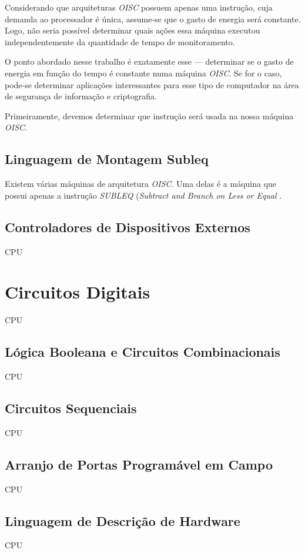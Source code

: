 Considerando que arquiteturas \textit{OISC} possuem apenas uma instrução, cuja
demanda ao processador é única, assume-se que o gasto de energia será
constante. Logo, não seria possível determinar quais ações essa máquina executou
independentemente da quantidade de tempo de monitoramento.

O ponto abordado nesse trabalho é exatamente esse --- determinar se o gasto de
energia em função do tempo é constante numa máquina \textit{OISC}. Se for o
caso, pode-se determinar aplicações interessantes para esse tipo de computador
na área de segurança de informação e criptografia.

Primeiramente, devemos determinar que instrução será usada na nossa máquina
\textit{OISC}.

\subsection{Linguagem de Montagem Subleq}
\label{subsec:subleq}

Existem várias máquinas de arquitetura \textit{OISC}. Uma delas é a máquina que
possui apenas a instrução \textit{SUBLEQ} (\textit{Subtract and Branch on Less
  or Equal} \cite{subleq}.


\subsection{Controladores de Dispositivos Externos}

CPU

\section{Circuitos Digitais}

CPU

\subsection{Lógica Booleana e Circuitos Combinacionais}

CPU

\subsection{Circuitos Sequenciais}

CPU

\subsection{Arranjo de Portas Programável em Campo}

CPU

\subsection{Linguagem de Descrição de Hardware}

CPU

